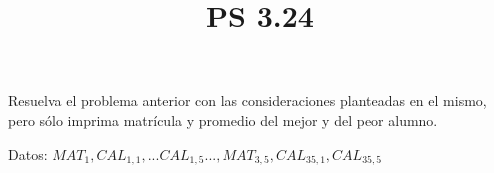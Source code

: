 \documentclass[11pt]{amsart}
\title{PS 3.24}
\begin{document}
\maketitle
 \noindent  Resuelva el problema anterior con las consideraciones planteadas en el mismo, pero sólo imprima matrícula y promedio del mejor y del peor alumno.  \newline

 \noindent Datos: $MAT_1, CAL_{1,1}, ...CAL_{1,5}..., MAT_{3,5},CAL_{35,1},CAL_{35,5}$
\end{document}
